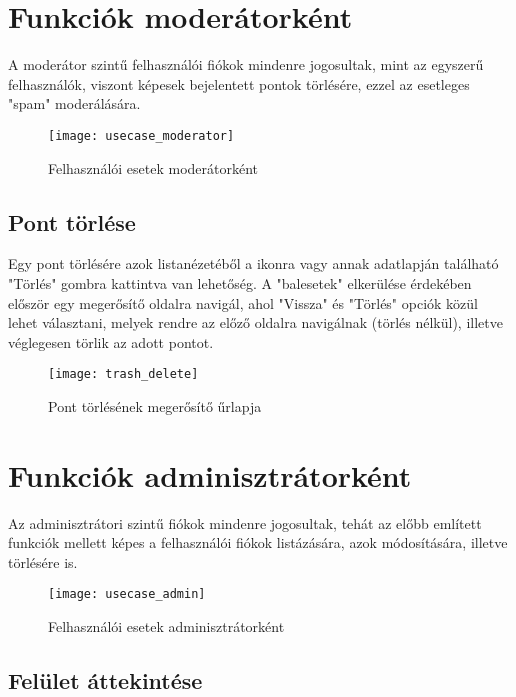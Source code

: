 \section{Funkciók moderátorként}

A moderátor szintű felhasználói fiókok mindenre jogosultak, mint az egyszerű felhasználók, viszont képesek bejelentett pontok törlésére, ezzel az esetleges "spam" moderálására.

\begin{figure}[H]
	\centering
	\texttt{[image: usecase\_moderator]}
	\caption{Felhasználói esetek moderátorként}
	\label{fig:usecase_moderator}
\end{figure}

\subsection{Pont törlése}
\label{subsec:trash_delete}

Egy pont törlésére azok listanézetéből a  ikonra vagy annak adatlapján található "Törlés" gombra kattintva van lehetőség. A "balesetek" elkerülése érdekében először egy megerősítő oldalra navigál, ahol "Vissza" és "Törlés" opciók közül lehet választani, melyek rendre az előző oldalra navigálnak (törlés nélkül), illetve véglegesen törlik az adott pontot.

\begin{figure}[H]
	\centering
	\texttt{[image: trash\_delete]}
	\caption{Pont törlésének megerősítő űrlapja}
	\label{fig:trash_delete}
\end{figure}

\section{Funkciók adminisztrátorként}

Az adminisztrátori szintű fiókok mindenre jogosultak, tehát az előbb említett funkciók mellett képes a felhasználói fiókok listázására, azok módosítására, illetve törlésére is.

\begin{figure}[H]
	\centering
	\texttt{[image: usecase\_admin]}
	\caption{Felhasználói esetek adminisztrátorként}
	\label{fig:usecase_admin}
\end{figure}

\subsection{Felület áttekintése}
\label{subsec:nav_admin}

